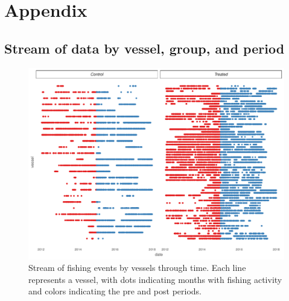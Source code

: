\documentclass[11pt,english]{article}
\begin{document}


\clearpage

\hypertarget{appendix}{%
\section{Appendix}\label{appendix}}

\setcounter{table}{0}  \renewcommand{\thetable}{S\arabic{table}} \setcounter{figure}{0} \renewcommand{\thefigure}{S\arabic{figure}}

\hypertarget{stream-of-data-by-vessel-group-and-period}{%
\subsection{Stream of data by vessel, group, and
period}\label{stream-of-data-by-vessel-group-and-period}}

\begin{figure}
\centering
\includegraphics{Manuscript_files/figure-latex/unnamed-chunk-18-1.pdf}
\caption{\label{fig:unnamed-chunk-18}\label{fig:baci_strict}Stream of
fishing events by vessels through time. Each line represents a vessel,
with dots indicating months with fishing activity and colors indicating
the pre and post periods.}
\end{figure}

\clearpage
\end{document}
